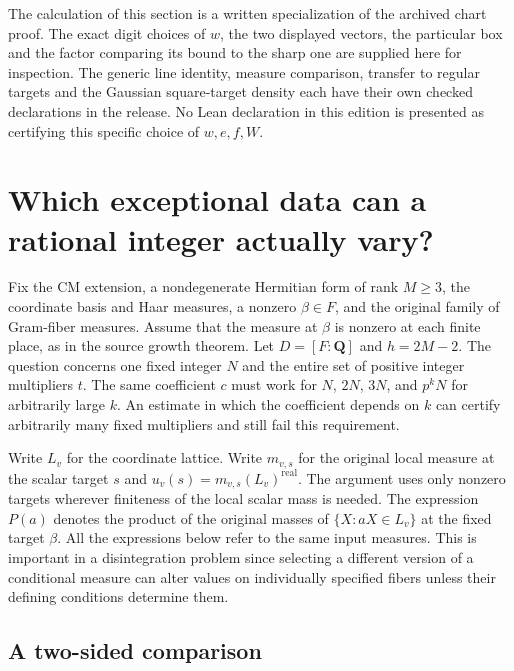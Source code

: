 \documentclass[12pt,letterpaper]{article}
\begin{document}
The calculation of this section is a written specialization of the archived chart proof. The exact digit choices of $w$, the two displayed vectors, the particular box and the factor comparing its bound to the sharp one are supplied here for inspection. The generic line identity, measure comparison, transfer to regular targets and the Gaussian square-target density each have their own checked declarations in the release. No Lean declaration in this edition is presented as certifying this specific choice of $w,e,f,W$.

\section{Which exceptional data can a rational integer actually vary?}
\label{sec:primeblocks}

Fix the CM extension, a nondegenerate Hermitian form of rank $M\geq3$, the coordinate basis and Haar measures, a nonzero $\beta\in F$, and the original family of Gram-fiber measures. Assume that the measure at $\beta$ is nonzero at each finite place, as in the source growth theorem. Let $D=[F:\mathbf Q]$ and $h=2M-2$. The question concerns one fixed integer $N$ and the entire set of positive integer multipliers $t$. The same coefficient $c$ must work for $N$, $2N$, $3N$, and $p^kN$ for arbitrarily large $k$. An estimate in which the coefficient depends on $k$ can certify arbitrarily many fixed multipliers and still fail this requirement.

Write $L_v$ for the coordinate lattice. Write $m_{v,s}$ for the original local measure at the scalar target $s$ and $u_v(s)=m_{v,s}(L_v)^{\mathrm{real}}$. The argument uses only nonzero targets wherever finiteness of the local scalar mass is needed. The expression $P(a)$ denotes the product of the original masses of $\{X:aX\in L_v\}$ at the fixed target $\beta$. All the expressions below refer to the same input measures. This is important in a disintegration problem since selecting a different version of a conditional measure can alter values on individually specified fibers unless their defining conditions determine them.

\subsection{A two-sided comparison}
\end{document}
